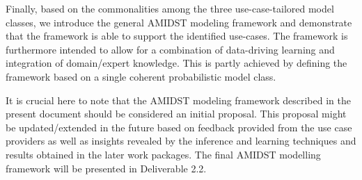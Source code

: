 
Finally, based on the commonalities among the three use-case-tailored model classes, we introduce the general AMIDST
modeling framework and demonstrate that the framework is able to support the identified use-cases. The framework is
furthermore intended to allow for a combination of data-driving learning and integration of domain/expert knowledge. This
is partly achieved by defining the framework based on a single coherent probabilistic model class.




It is crucial here to note that the AMIDST modeling framework described in the present document should be considered an initial proposal. This
proposal might be updated/extended in the future based on feedback provided from the use case providers as well as insights
revealed by the inference and learning techniques and results obtained in the later work packages. The final AMIDST
modelling framework will be presented in Deliverable 2.2. 



